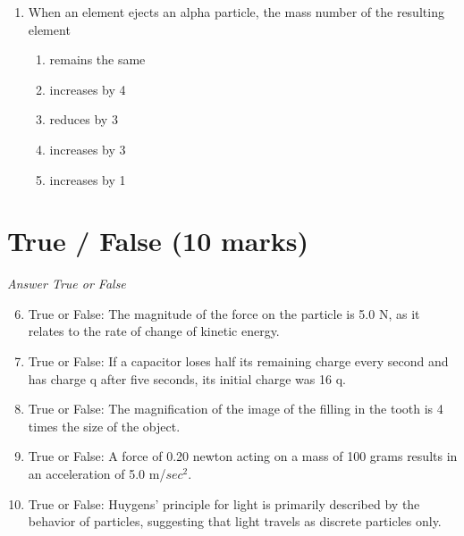 \documentclass[12pt]{article}
\begin{document}
\begin{enumerate}[label=\arabic*.]
\begin{enumerate}[label=(\alph*)]
    \item 6.7 \ensuremath{\times} 10^-17 kg
    \item 2.2 \ensuremath{\times} 10^-22 kg
    \item 3.0 \ensuremath{\times} 10^-32 kg
    \item 5.5 \ensuremath{\times} 10^-31 kg
    \item 1.76 \ensuremath{\times} $10^11$ kg
\end{enumerate}
\item When an element ejects an alpha particle, the mass number of the resulting element
\begin{enumerate}[label=(\alph*)]
    \item remains the same
    \item increases by 4
    \item reduces by 3
    \item increases by 3
    \item increases by 1
\end{enumerate}
\end{enumerate}

\section*{True / False (10 marks)}
\textit{Answer True or False}
\begin{enumerate}[label=\arabic*.]
\setcounter{enumi}{5}
\item True or False: The magnitude of the force on the particle is 5.0 N, as it relates to the rate of change of kinetic energy.
\item True or False: If a capacitor loses half its remaining charge every second and has charge q after five seconds, its initial charge was 16 q.
\item True or False: The magnification of the image of the filling in the tooth is 4 times the size of the object.
\item True or False: A force of 0.20 newton acting on a mass of 100 grams results in an acceleration of 5.0 m/$sec^2$.
\item True or False: Huygens' principle for light is primarily described by the behavior of particles, suggesting that light travels as discrete particles only.
\end{enumerate}
\end{document}
